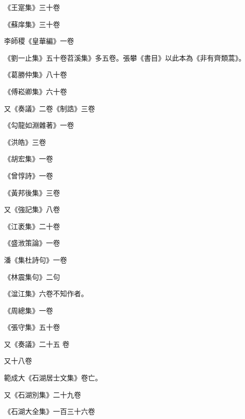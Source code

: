 \begin{pinyinscope}
 《王寔集》三十卷



 《蘇庠集》三十卷



 李師稷《皇華編》一卷



 《劉一止集》五十卷苕溪集》多五卷。張攀《書目》以此本為《非有齊類蒿》。



 《葛勝仲集》八十卷



 《傅崧卿集》六十卷



 又《奏議》二卷《制誥》三卷



 《勾龍如淵雜著》一卷



 《洪皓》三卷



 《胡宏集》一卷



 《曾惇詩》一卷



 《黃邦後集》三卷



 又《強記集》八卷



 《江袤集》二十卷



 《盛浟策論》一卷



 潘《集杜詩句》一卷



 《林震集句》二句



 《湓江集》六卷不知作者。



 《周總集》一卷



 《張守集》五十卷



 又《奏議》二十五
 卷



 又十八卷



 範成大《石湖居士文集》卷亡。



 又《石湖別集》二十九卷



 《石湖大全集》一百三十六卷




\end{pinyinscope}
